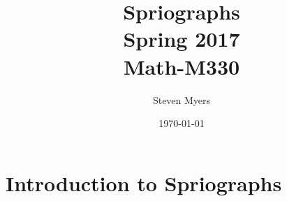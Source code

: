 \documentclass{article}
\begin{document}
\title{Spriographs\\ Spring 2017\\ Math-M330}         %
\author{Steven Myers}        %
\date{\today}          %
\maketitle


\makeatother     %

\pagestyle{plain}

\section*{Introduction to Spriographs}



\end{document}
